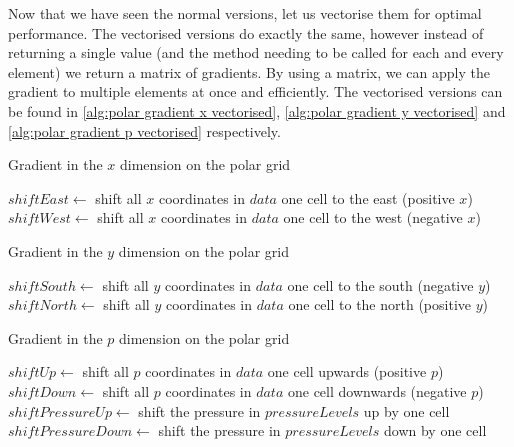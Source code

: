 Now that we have seen the normal versions, let us vectorise them for optimal performance. The vectorised versions do exactly the same, however instead of returning a single value (and the method
needing to be called for each and every element) we return a matrix of gradients. By using a matrix, we can apply the gradient to multiple elements at once and efficiently. The vectorised 
versions can be found in \autoref{alg:polar gradient x vectorised}, \autoref{alg:polar gradient y vectorised} and \autoref{alg:polar gradient p vectorised} respectively.

\begin{algorithm}[htb]
    \caption{Gradient in the $x$ dimension on the polar grid}
    \label{alg:polar gradient x vectorised}
    $shiftEast \leftarrow $ shift all $x$ coordinates in $data$ one cell to the east (positive $x$) \;
    $shiftWest \leftarrow $ shift all $x$ coordinates in $data$ one cell to the west (negative $x$) \;
\end{algorithm}

\begin{algorithm}[htb]
    \caption{Gradient in the $y$ dimension on the polar grid}
    \label{alg:polar gradient y vectorised}
    $shiftSouth \leftarrow $ shift all $y$ coordinates in $data$ one cell to the south (negative $y$) \;
    $shiftNorth \leftarrow $ shift all $y$ coordinates in $data$ one cell to the north (positive $y$) \;
\end{algorithm}

\begin{algorithm}[htb]
    \caption{Gradient in the $p$ dimension on the polar grid}
    \label{alg:polar gradient p vectorised}
    $shiftUp\leftarrow $ shift all $p$ coordinates in $data$ one cell upwards (positive $p$) \;
    $shiftDown \leftarrow $ shift all $p$ coordinates in $data$ one cell downwards (negative $p$) \;
    $shiftPressureUp \leftarrow$ shift the pressure in $pressureLevels$ up by one cell \;
    $shiftPressureDown \leftarrow$ shift the pressure in $pressureLevels$ down by one cell \;
\end{algorithm}
